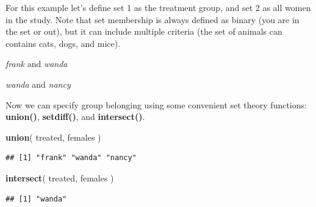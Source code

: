 \documentclass[]{book}
\newenvironment{Shaded}{\begin{snugshade}}{\end{snugshade}}
\newcommand{\KeywordTok}[1]{\textcolor[rgb]{0.13,0.29,0.53}{\textbf{#1}}}
\newcommand{\NormalTok}[1]{#1}
\newcommand{\OperatorTok}[1]{\textcolor[rgb]{0.81,0.36,0.00}{\textbf{#1}}}
\newcommand{\StringTok}[1]{\textcolor[rgb]{0.31,0.60,0.02}{#1}}
\theoremstyle{definition}
\theoremstyle{definition}
\theoremstyle{definition}
\theoremstyle{remark}
\begin{document}
For this example let's define set 1 as the treatment group, and set 2 as
all women in the study. Note that set membership is always defined as
binary (you are in the set or out), but it can include multiple criteria
(the set of animals can contains cats, dogs, and mice).

\begin{Shaded}
\end{Shaded}

\emph{frank} and \emph{wanda}

\begin{Shaded}
\end{Shaded}

\emph{wanda} and \emph{nancy}

Now we can specify group belonging using some convenient set theory
functions: \textbf{union()}, \textbf{setdiff()}, and
\textbf{intersect()}.

\begin{Shaded}
\begin{Highlighting}[]
\KeywordTok{union}\NormalTok{( treated, females )}
\end{Highlighting}
\end{Shaded}

\begin{verbatim}
## [1] "frank" "wanda" "nancy"
\end{verbatim}

\begin{Shaded}
\begin{Highlighting}[]
\KeywordTok{intersect}\NormalTok{( treated, females )}
\end{Highlighting}
\end{Shaded}

\begin{verbatim}
## [1] "wanda"
\end{verbatim}
\end{document}
